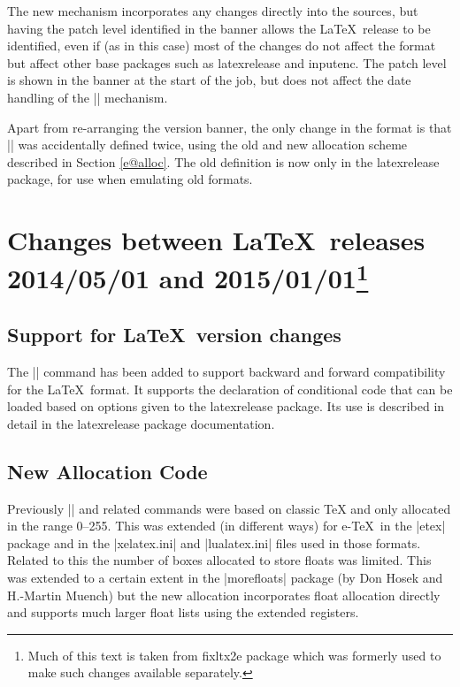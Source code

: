 \documentclass{ltxguide}
\newcommand\Lpack[1]{\mbox{\textsf{#1}}}
\newcommand\DescribeMacro[1]{\texttt{\string#1}}
\begin{document}
The new mechanism incorporates any changes directly into the sources,
but having the patch level identified in the banner allows the
\LaTeX\ release to be identified, even if (as in this case) most of the
changes do not affect the format but affect other base packages such
as \Lpack{latexrelease} and \Lpack{inputenc}. The patch level is shown
in the banner at the start of the job, but does not affect the date
handling of the |\IncludeInRelease| mechanism.

Apart from re-arranging the version banner, the only change in the
format is that |\newtoks| was accidentally defined twice, using the
old and new allocation scheme described in Section \ref{e@alloc}.
The old definition is now only in the \Lpack{latexrelease} package,
for use when emulating old formats.




\section
[Changes between  \LaTeX\ releases 2014/05/01 and 2015/01/01]
{Changes between \LaTeX\ releases 2014/05/01 and 2015/01/01\footnote{Much of this text
is taken from \Lpack{fixltx2e} package which was formerly used to make such changes available separately.}}

\subsection{Support for \LaTeX\ version changes}
\DescribeMacro{}

\smallskip

The || command has been added to support backward and
forward compatibility for the \LaTeX\ format. It supports the
declaration of conditional code that can be loaded based on options
given to the \Lpack{latexrelease} package. Its use is described in
detail in the \Lpack{latexrelease} package documentation.

\subsection{New Allocation Code\label{e@alloc}}
Previously |\newcount| and related commands were based on classic TeX
and only allocated in the range 0--255. This was extended (in
different ways) for e-\TeX\ in the |etex| package and in the
|xelatex.ini| and |lualatex.ini| files used in those formats. Related
to this the number of boxes allocated to store floats was
limited. This was extended to a certain extent in the |morefloats|
package (by Don Hosek and H.-Martin Muench) but the new allocation
incorporates float allocation directly and supports much larger float
lists using the extended registers.
\end{document}
